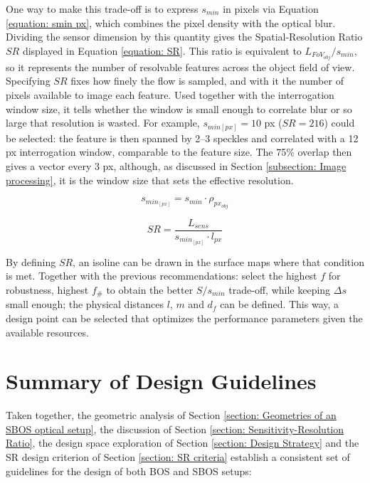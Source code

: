 \par One way to make this trade-off is to express $s_{min}$ in pixels via Equation \ref{equation: smin px}, which combines the pixel density with the optical blur. Dividing the sensor dimension by this quantity gives the Spatial-Resolution Ratio $SR$ displayed in Equation \ref{equation: SR}. This ratio is equivalent to $L_{FoV_{obj}}/s_{min}$, so it represents the number of resolvable features across the object field of view. Specifying $SR$ fixes how finely the flow is sampled, and with it the number of pixels available to image each feature. Used together with the interrogation window size, it tells whether the window is small enough to correlate blur or so large that resolution is wasted. For example, $s_{min[px]} = 10$ px ($SR = 216$) could be selected: the feature is then spanned by 2–3 speckles and correlated with a 12 px interrogation window, comparable to the feature size. The 75\% overlap then gives a vector every 3 px, although, as discussed in Section \ref{subsection: Image processing}, it is the window size that sets the effective resolution.

\begin{equation}
    \label{equation: smin px}
    s_{min_{[px]}} = s_{min} \cdot \rho_{px_{obj}}
\end{equation}

\begin{equation}
    \label{equation: SR}
    SR = \frac{L_{sens}}{s_{min_{[px]}} \cdot l_{px}}
\end{equation}

\par By defining $SR$, an isoline can be drawn in the surface maps where that condition is met. Together with the previous recommendations: select the highest $f$ for robustness, highest $f_\#$ to obtain the better $S/s_{min}$ trade-off, while keeping $\Delta s$ small enough; the physical distances $l$, $m$ and $d_f$ can be defined. This way, a design point can be selected that optimizes the performance parameters given the available resources.

\section{Summary of Design Guidelines}
\label{section: Summary of Practical Guidelines}

\par Taken together, the geometric analysis of Section \ref{section: Geometries of an SBOS optical setup}, the discussion of Section \ref{section: Sensitivity-Resolution Ratio}, the design space exploration of Section \ref{section: Design Strategy} and the SR design criterion of Section \ref{section: SR criteria} establish a consistent set of guidelines for the design of both BOS and SBOS setups: 

